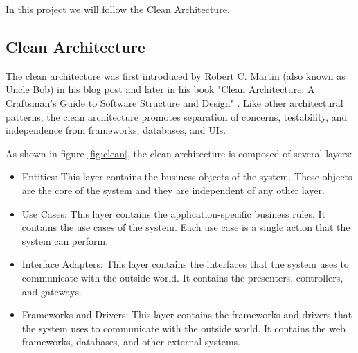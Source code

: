 \begin{spacing}{1.2}
    In this project we will follow the Clean Architecture.


    \subsection{Clean Architecture}
    The clean architecture was first introduced by Robert C. Martin (also known as Uncle Bob)
    in his blog post \cite{cleanBlog} and later in his book "Clean Architecture: A Craftsman's Guide to Software Structure and
    Design" \cite{clean}. Like other architectural patterns, the clean architecture promotes
    separation of concerns, testability, and independence from frameworks, databases, and UIs.

    As shown in figure \ref{fig:clean}, the clean architecture is composed of several layers:
    \begin{itemize}
        \item Entities: This layer contains the business objects of the system. These objects are the core of the system and they are independent of any other layer.
        \item Use Cases: This layer contains the application-specific business rules. It contains the use cases of the system. Each use case is a single action that the system can perform.
        \item Interface Adapters: This layer contains the interfaces that the system uses to communicate with the outside world. It contains the presenters, controllers, and gateways.
        \item Frameworks and Drivers: This layer contains the frameworks and drivers that the system uses to communicate with the outside world. It contains the web frameworks, databases, and other external systems.

    \end{itemize}


\end{spacing}
